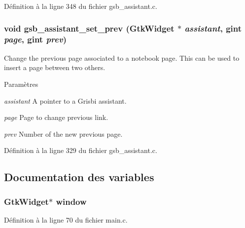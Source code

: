 Définition à la ligne 348 du fichier gsb\_\-assistant.c.

\subsubsection[{gsb\_\-assistant\_\-set\_\-prev}]{\setlength{\rightskip}{0pt plus 5cm}void gsb\_\-assistant\_\-set\_\-prev (GtkWidget $\ast$ {\em assistant}, \/  gint {\em page}, \/  gint {\em prev})}\label{gsb__assistant_8c_a9c400b973258731e6d4dd4a01a63e1aa}
Change the previous page associated to a notebook page. This can be used to insert a page between two others.


\begin{DoxyParams}{Paramètres}
\item[{\em assistant}]A pointer to a Grisbi assistant. \item[{\em page}]Page to change previous link. \item[{\em prev}]Number of the new previous page. \end{DoxyParams}


Définition à la ligne 329 du fichier gsb\_\-assistant.c.



\subsection{Documentation des variables}
\subsubsection[{window}]{\setlength{\rightskip}{0pt plus 5cm}GtkWidget$\ast$ {\bf window}}\label{gsb__assistant_8c_a3d346c08cf2d67c388caabffb412b293}


Définition à la ligne 70 du fichier main.c.

